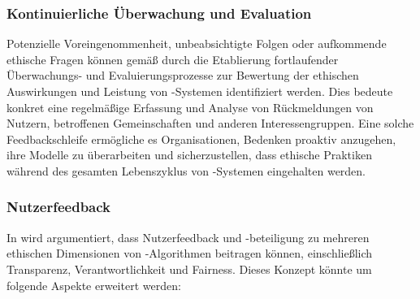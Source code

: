 \documentclass[12pt]{report}
\begin{document}
\subsubsection{Kontinuierliche Überwachung und Evaluation}
Potenzielle Voreingenommenheit, unbeabsichtigte Folgen oder aufkommende ethische Fragen können gemäß \cite{EUCommision} durch die Etablierung fortlaufender Überwachungs- und Evaluierungsprozesse zur Bewertung der ethischen Auswirkungen und Leistung von -Systemen identifiziert werden. Dies bedeute konkret eine regelmäßige Erfassung und Analyse von Rückmeldungen von Nutzern, betroffenen Gemeinschaften und anderen Interessengruppen. Eine solche Feedbackschleife ermögliche es Organisationen, Bedenken proaktiv anzugehen, ihre Modelle zu überarbeiten und sicherzustellen, dass ethische Praktiken während des gesamten Lebenszyklus von -Systemen eingehalten werden.

\subsubsection{Nutzerfeedback}
In \cite[The ethics of algorithms: Mapping the debate]{Mittelstadt} wird argumentiert, dass Nutzerfeedback und -beteiligung zu mehreren ethischen Dimensionen von -Algorithmen beitragen können, einschließlich Transparenz, Verantwortlichkeit und Fairness. Dieses Konzept könnte um folgende Aspekte erweitert werden:
\end{document}
